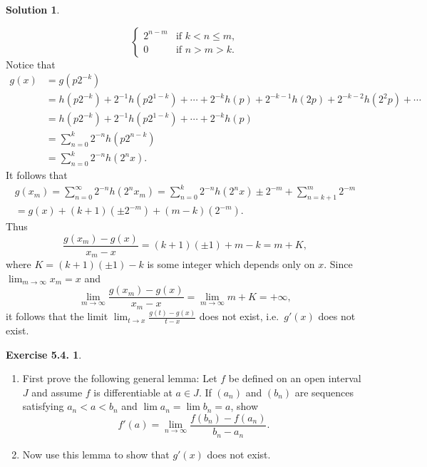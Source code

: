 \documentclass[12pt]{article}
\theoremstyle{definition}
\theoremstyle{exercise}
\newtheorem{exercise}{Exercise 5.4.}
\theoremstyle{solution}
\newtheorem*{solution}{Solution}
\begin{document}
\begin{solution}
\begin{enumerate}
\[\begin{cases}
                2^{n - m} & \text{if } k < n \leq m, \\
                0 & \text{if } n > m > k.
            \end{cases}
        \]
        Notice that
        \begin{align*}
            g(x) &= g(p 2^{-k}) \\[2mm]
            &= h(p 2^{-k}) + 2^{-1} h(p 2^{1-k}) + \cdots + 2^{-k} h(p) + 2^{-k-1} h(2p) + 2^{-k-2} h(2^2 p) + \cdots \\[2mm]
            &= h(p 2^{-k}) + 2^{-1} h(p 2^{1-k}) + \cdots + 2^{-k} h(p) \\[2mm]
            &= \sum_{n=0}^k 2^{-n} h(p 2^{n - k}) \\[2mm]
            &= \sum_{n=0}^k 2^{-n} h(2^n x).
        \end{align*}
        It follows that
        \begin{multline*}
            g(x_m) = \sum_{n=0}^{\infty} 2^{-n} h(2^n x_m) = \sum_{n=0}^k 2^{-n} h(2^n x) \pm 2^{-m} + \sum_{n=k+1}^m 2^{-m} \\[2mm] = g(x) + (k + 1)(\pm 2^{-m}) + (m - k)(2^{-m}).
        \end{multline*}
        Thus
        \[
            \frac{g(x_m) - g(x)}{x_m - x} = (k + 1)(\pm 1) + m - k = m + K,
        \]
        where \( K = (k + 1)(\pm 1) - k \) is some integer which depends only on \( x \). Since \( \lim_{m \to \infty} x_m = x \) and
        \[
            \lim_{m \to \infty} \frac{g(x_m) - g(x)}{x_m - x} = \lim_{m \to \infty} m + K = +\infty,
        \]
        it follows that the limit \( \lim_{t \to x} \frac{g(t) - g(x)}{t - x} \) does not exist, i.e.\ \( g'(x) \) does not exist.
    \end{enumerate}
\end{solution}

\begin{exercise}
\label{ex:7}
    \begin{enumerate}
        \item First prove the following general lemma: Let \( f \) be defined on an open interval \( J \) and assume \( f \) is differentiable at \( a \in J \). If \( (a_n) \) and \( (b_n) \) are sequences satisfying \( a_n < a < b_n \) and \( \lim a_n = \lim b_n = a \), show
        \[
            f'(a) = \lim_{n \to \infty} \frac{f(b_n) - f(a_n)}{b_n - a_n}.
        \]

        \item Now use this lemma to show that \( g'(x) \) does not exist.
    \end{enumerate}
\end{exercise}
\end{document}
